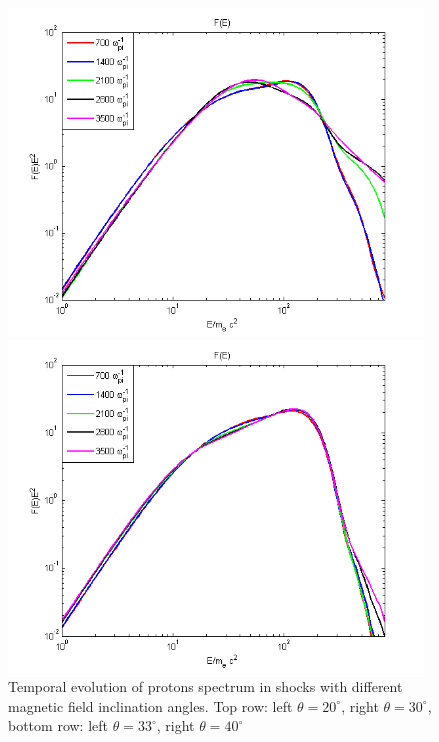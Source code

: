 \documentclass[a4paper]{jpconf}
\begin{document}
\begin{figure}[h!]
\begin{minipage}{0.49\textwidth}
		\includegraphics[width=0.98\textwidth]{fig/spectrump33.png} 
	\end{minipage}
	\begin{minipage}{0.49\textwidth}
		\centering
		\includegraphics[width=0.98\textwidth]{fig/spectrump40.png} 
	\end{minipage}
	\caption{Temporal evolution of protons spectrum in shocks with different magnetic field inclination angles. Top row: left $\theta = 20^\circ$, right $\theta = 30^\circ$, bottom row: left $\theta = 33^\circ$, right $\theta = 40^\circ$}
	\label{spectrump}
\end{figure}
	
\end{document}
